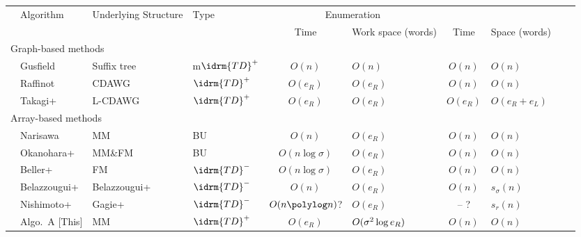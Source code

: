 \begin{minipage}{\textwidth}
\hspace{-1.2em}
\begin{tabular}{p{.5em}lp{7.8em}lc>{\centering}p{5em}c>{}p{5.9em}ll}\toprule
& Algorithm	& Underlying \break Structure	& Type
&\multicolumn{2}{c}{Enumeration}
&\multicolumn{2}{c}{Indexing} \\
\cmidrule(l{1.0em}r){5-6}\cmidrule{7-8}
& & & 
 & Time & Work space (words)
 & Time & Space (words)
\\
\midrule 
\multicolumn{7}{l}{Graph-based methods} \\
& Gusfield~\cite{gusfield1997algorithms}	& Suffix tree	& m$\idrm{TD}^{+}$ & $O(n)$	& $O(n)$	& $O(n)$	& $O(n)$	 \\
& Raffinot~\cite{raffinot2001maximal}	& CDAWG~\cite{blumer1987complete} 	& $\idrm{TD}^{+}$ & $O(e_R)$	& $O(e_R)$	& $O(n)$	& $O(n)$	 \\
& Takagi+~\cite{takagi2017linear}  	& L-CDAWG 	& $\idrm{TD}^{+}$ & $O(e_R)$	& $O(e_R)$	& $O(e_R)$	& $O(e_R+e_L)$	 \\
\midrule 
\multicolumn{7}{l}{Array-based methods} \\
& Narisawa~\cite{narisawa2007efficient}	& MM\cite{manber:myers1993suffixarrays} & BU & $O(n)$	& $O(e_R)$	& $O(n)$	& $O(n)$	 \\
& Okanohara+~\cite{okanohara2009text}	& MM\cite{manber:myers1993suffixarrays}\&FM\cite{Ferragina05:FM} & BU & $O(n\log\sigma)$	& $O(e_R)$	& $O(n)$	& $O(n)$	 \\
& Beller+~\cite{bellergogohlebusch2013computing} 	& FM~\cite{Ferragina05:FM} & $\idrm{TD}^{-}$ & $O(n\log\sigma)$	& $O(e_R)$	& $O(n)$	& $O(n)$	 \\
& Belazzougui+\cite{belazzougui2020linear} 	& Belazzougui+\cite{belazzougui2020linear} & $\idrm{TD}^{-}$ & $O(n)$	& $O(e_R)$	& $O(n)$	& $s_\sigma(n)$	 \\
& Nishimoto+~\cite{nishimoto:cpm2021enum} 	& Gagie+~\cite{gagie:navarro:prezza2020fully} & $\idrm{TD}^{-}$ & $O(n\polylog n)$?	& $O(e_R)$	& -- ?	& $s_r(n)$	 \\
\midrule 
& Algo.~A [This]	& MM~\cite{manber:myers1993suffixarrays} & $\idrm{TD}^{+}$ & $O(e_R)$	& $O(\sigma^2\log e_{R}) $	& $O(n)$	& $O(n)$	 \\

\end{tabular}
\end{minipage}
